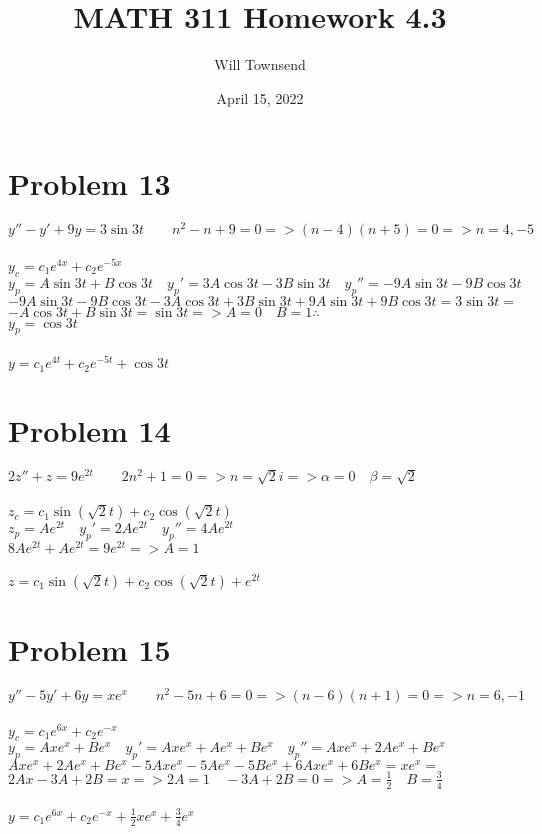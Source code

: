 \documentclass[12pt]{exam}
\title{\textbf{MATH 311 Homework 4.3}}
\author{Will Townsend}
\date{April 15, 2022}
\begin{document}
\maketitle

\section*{Problem 13}
$y''-y'+9y=3\sin{3t}\qquad n^2-n+9=0=>(n-4)(n+5)=0=>n=4,-5$\\\\
$y_c=c_1e^{4x}+c_2e^{-5x}$\\
$y_p=A\sin{3t}+B\cos{3t}\quad y_p'=3A\cos{3t}-3B\sin{3t}\quad y_p''=-9A\sin{3t}-9B\cos{3t}$\\
$-9A\sin{3t}-9B\cos{3t}-3A\cos{3t}+3B\sin{3t}+9A\sin{3t}+9B\cos{3t}=3\sin{3t}=$\\
$-A\cos{3t}+B\sin{3t}=\sin{3t}=>A=0\quad B=1\therefore$\\
$y_p=\cos{3t}$\\\\
$y=c_1e^{4t}+c_2e^{-5t}+\cos{3t}$
\section*{Problem 14}
$2z''+z=9e^{2t}\qquad 2n^2+1=0=>n=\sqrt{2}i=>\alpha=0\quad\beta=\sqrt{2}$\\\\
$z_c=c_1\sin{\left(\sqrt{2}t\right)}+c_2\cos{\left(\sqrt{2}t\right)}$\\
$z_p=Ae^{2t}\quad y_p'=2Ae^{2t}\quad y_p''=4Ae^{2t}$\\
$8Ae^{2t}+Ae^{2t}=9e^{2t}=>A=1$\\\\
$z=c_1\sin{\left(\sqrt{2}t\right)}+c_2\cos{\left(\sqrt{2}t\right)}+e^{2t}$
\section*{Problem 15}
$y''-5y'+6y=xe^x\qquad n^2-5n+6=0=>(n-6)(n+1)=0=>n=6,-1$\\\\
$y_c=c_1e^{6x}+c_2e^{-x}$\\
$y_p=Axe^x+Be^x\quad y_p'=Axe^x+Ae^x+Be^x\quad y_p''=Axe^x+2Ae^x+Be^x$\\
$Axe^x+2Ae^x+Be^x-5Axe^x-5Ae^x-5Be^x+6Axe^x+6Be^x=xe^x=$\\
$2Ax-3A+2B=x=>2A=1\quad-3A+2B=0=>A=\frac{1}{2}\quad B=\frac{3}{4}$\\\\
$y=c_1e^{6x}+c_2e^{-x}+\frac{1}{2}xe^x+\frac{3}{4}e^x$
\end{document}
